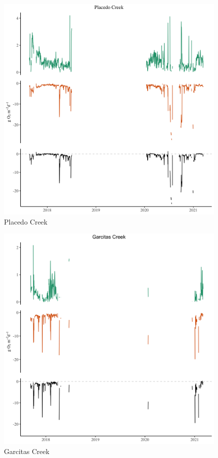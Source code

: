 \begin{figure}[htb]
\begin{center}
\includegraphics[scale=0.2]{Figs/PLC.png}
\caption{Placedo Creek}
\label{Fig:PLC}
\end{center}
\end{figure}

\begin{figure}[htb]
\begin{center}
\includegraphics[scale=0.2]{Figs/GC.png}
\caption{Garcitas Creek}
\label{Fig:GC}
\end{center}
\end{figure}

